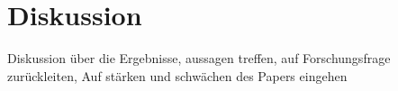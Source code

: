 \section{Diskussion}\label{sec:Analyse}
Diskussion über die Ergebnisse, aussagen treffen, auf Forschungsfrage zurückleiten, Auf stärken und schwächen des Papers eingehen
